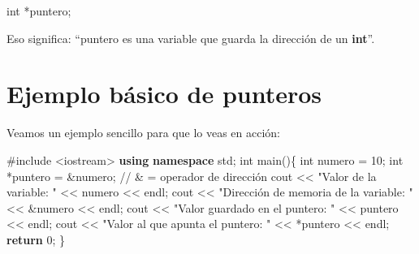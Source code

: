 \documentclass[
  11pt,
  a4paper,
  DIV=11,
  numbers=noendperiod]{scrreprt}
\newenvironment{Shaded}{\begin{snugshade}}{\end{snugshade}}
\newcommand{\CommentTok}[1]{\textcolor[rgb]{0.37,0.37,0.37}{#1}}
\newcommand{\ControlFlowTok}[1]{\textcolor[rgb]{0.00,0.23,0.31}{\textbf{#1}}}
\newcommand{\DataTypeTok}[1]{\textcolor[rgb]{0.68,0.00,0.00}{#1}}
\newcommand{\DecValTok}[1]{\textcolor[rgb]{0.68,0.00,0.00}{#1}}
\newcommand{\ImportTok}[1]{\textcolor[rgb]{0.00,0.46,0.62}{#1}}
\newcommand{\KeywordTok}[1]{\textcolor[rgb]{0.00,0.23,0.31}{\textbf{#1}}}
\newcommand{\NormalTok}[1]{\textcolor[rgb]{0.00,0.23,0.31}{#1}}
\newcommand{\OperatorTok}[1]{\textcolor[rgb]{0.37,0.37,0.37}{#1}}
\newcommand{\PreprocessorTok}[1]{\textcolor[rgb]{0.68,0.00,0.00}{#1}}
\newcommand{\StringTok}[1]{\textcolor[rgb]{0.13,0.47,0.30}{#1}}
\begin{document}
\begin{Shaded}
\begin{Highlighting}[]
\DataTypeTok{int} \OperatorTok{*}\NormalTok{puntero}\OperatorTok{;}
\end{Highlighting}
\end{Shaded}

Eso significa: ``puntero es una variable que guarda la dirección de un
\textbf{int}''.

\section{Ejemplo básico de
punteros}\label{ejemplo-buxe1sico-de-punteros}

Veamos un ejemplo sencillo para que lo veas en acción:

\begin{Shaded}
\begin{Highlighting}[]
\PreprocessorTok{\#include }\ImportTok{\textless{}iostream\textgreater{}}\PreprocessorTok{ }
\KeywordTok{using} \KeywordTok{namespace}\NormalTok{ std}\OperatorTok{;} 
\DataTypeTok{int}\NormalTok{ main}\OperatorTok{()\{}     
    \DataTypeTok{int}\NormalTok{ numero }\OperatorTok{=} \DecValTok{10}\OperatorTok{;}     
    \DataTypeTok{int} \OperatorTok{*}\NormalTok{puntero }\OperatorTok{=} \OperatorTok{\&}\NormalTok{numero}\OperatorTok{;} \CommentTok{// \& = operador de dirección      }
\NormalTok{    cout }\OperatorTok{\textless{}\textless{}} \StringTok{"Valor de la variable: "} \OperatorTok{\textless{}\textless{}}\NormalTok{ numero }\OperatorTok{\textless{}\textless{}}\NormalTok{ endl}\OperatorTok{;}     
\NormalTok{    cout }\OperatorTok{\textless{}\textless{}} \StringTok{"Dirección de memoria de la variable: "} \OperatorTok{\textless{}\textless{}} \OperatorTok{\&}\NormalTok{numero }\OperatorTok{\textless{}\textless{}}\NormalTok{ endl}\OperatorTok{;}     
\NormalTok{    cout }\OperatorTok{\textless{}\textless{}} \StringTok{"Valor guardado en el puntero: "} \OperatorTok{\textless{}\textless{}}\NormalTok{ puntero }\OperatorTok{\textless{}\textless{}}\NormalTok{ endl}\OperatorTok{;}     
\NormalTok{    cout }\OperatorTok{\textless{}\textless{}} \StringTok{"Valor al que apunta el puntero: "} \OperatorTok{\textless{}\textless{}} \OperatorTok{*}\NormalTok{puntero }\OperatorTok{\textless{}\textless{}}\NormalTok{ endl}\OperatorTok{;}      
    \ControlFlowTok{return} \DecValTok{0}\OperatorTok{;} 
\OperatorTok{\}}
\end{Highlighting}
\end{Shaded}
\end{document}
